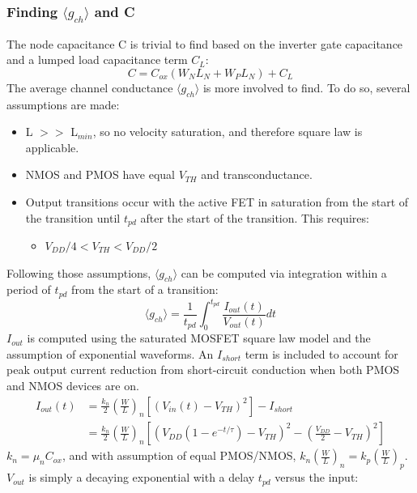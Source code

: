 		\subsubsection{Finding $\langle g_{ch}\rangle$ and C}
			The node capacitance C is trivial to find based on the inverter gate capacitance and a lumped load capacitance term $C_L$:
			\begin{equation}
				C = C_{ox}\left ( W_N L_N + W_P L_N \right) + C_L
			\end{equation}
			The average channel conductance $\langle g_{ch} \rangle$ is more involved to find. To do so, several assumptions are made:
			\begin{itemize}
				\item L $>>$ L$_{min}$, so no velocity saturation, and therefore square law is applicable.
				\item NMOS and PMOS have equal $V_{TH}$ and transconductance.
				\item Output transitions occur with the active FET in saturation from the start of the transition until $t_{pd}$ after the start of the transition. This requires:
				\begin{itemize}
					\item $V_{DD}/4 < V_{TH} < V_{DD}/2$
				\end{itemize}
			\end{itemize}
			Following those assumptions, $\langle g_{ch} \rangle$ can be computed via integration within a period of $t_{pd}$ from the start of a transition:
			\begin{equation}
				\langle g_{ch} \rangle = \frac{1}{t_{pd}} \int_0^{t_{pd}}\frac{I_{out}(t)}{V_{out}(t)}dt
			\end{equation}
			$I_{out}$ is computed using the saturated MOSFET square law model and the assumption of exponential waveforms. An $I_{short}$ term is included to account for peak output current reduction from short-circuit conduction when both PMOS and NMOS devices are on.
			\begin{align}
				I_{out}(t) &= \frac{k_n}{2}\left(\frac{W}{L}\right)_n\left[\left(V_{in}(t) - V_{TH}\right)^2 \right]  - I_{short} \\
				&= \frac{k_n}{2}\left(\frac{W}{L}\right)_n \left[\left(V_{DD}\left(1-e^{-t/\tau}\right) - V_{TH}\right)^2 - \left(\frac{V_{DD}}{2} -V_{TH}\right)^2\right]
			\end{align}
			$k_n = \mu_nC_{ox}$, and with assumption of equal PMOS/NMOS, $k_n\left(\frac{W}{L}\right)_n=k_p\left(\frac{W}{L}\right)_p$. $V_{out}$ is simply a decaying exponential with a delay $t_{pd}$ versus the input:
